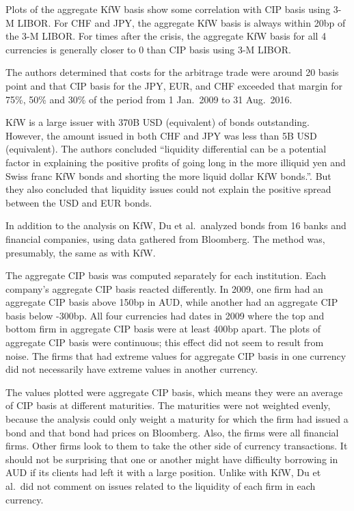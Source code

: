 Plots of the aggregate KfW basis show some correlation with CIP basis using 3-M LIBOR.  For CHF and JPY, the aggregate KfW basis is always within 20bp of the 3-M LIBOR.    For times after the crisis, the aggregate KfW basis for all 4 currencies is generally closer to 0 than CIP basis using 3-M LIBOR.  

The authors determined that costs for the arbitrage trade were around 20 basis point and that CIP basis for the JPY, EUR, and CHF exceeded that margin for 75\%, 50\% and 30\% of the period from 1 Jan.\ 2009 to 31 Aug.\ 2016.   



KfW is a large issuer with 370B USD (equivalent) of bonds outstanding.  However, the amount issued in both CHF and JPY was less than 5B USD (equivalent).  The authors concluded ``liquidity differential can be a potential factor in explaining the positive profits of going long in the more illiquid yen and Swiss franc KfW bonds and shorting the more liquid dollar KfW bonds.''.  But they also concluded that liquidity issues could not explain the positive spread between the USD and EUR bonds.  


In addition to the analysis on KfW, Du et al.\ analyzed bonds from 16 banks and financial companies, using data gathered from Bloomberg.  The method was, presumably, the same as with KfW.  

The aggregate CIP basis was computed separately for each institution.  Each company's aggregate CIP basis reacted differently.  In 2009, one firm had an aggregate CIP basis above 150bp in AUD, while another had an aggregate CIP basis below -300bp.   All four currencies had dates in 2009 where the top and bottom firm in aggregate CIP basis were at least 400bp apart.  The plots of aggregate CIP basis were continuous; this effect did not seem to result from noise.  The firms that had extreme values for aggregate CIP basis in one currency did not necessarily have extreme values in another currency.  

The values plotted were aggregate CIP basis, which means they were an average of CIP basis at different maturities.  The maturities were not weighted evenly, because the analysis could only weight a maturity for which the firm had issued a bond and that bond had prices on Bloomberg. Also, the firms were all financial firms.  Other firms look to them to take the other side of currency transactions.  It should not be surprising that one or another might have difficulty borrowing in AUD if its clients had left it with a large position.  Unlike with KfW, Du et al.\ did not comment on issues related to the liquidity of each firm in each currency.   


